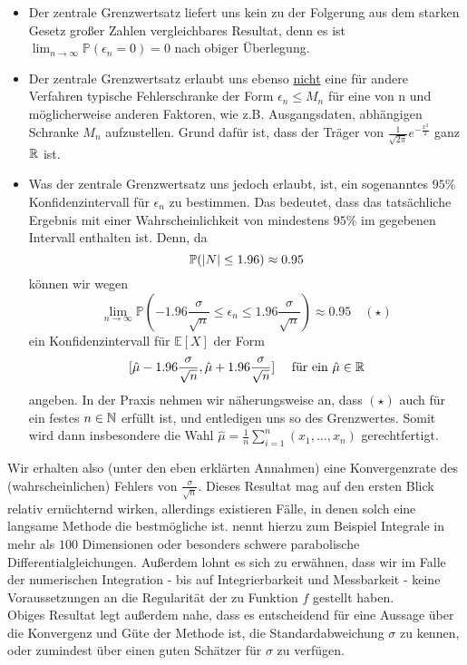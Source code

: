 	 \begin{itemize}
	 	\item Der zentrale Grenzwertsatz liefert uns kein zu der Folgerung aus dem starken Gesetz großer Zahlen vergleichbares Resultat, denn es ist  $ \lim_{n \to \infty} \mathbb{P}(\epsilon_n = 0) = 0 $ nach obiger Überlegung.
	 	\item Der zentrale Grenzwertsatz erlaubt uns ebenso \underline{nicht} eine für andere Verfahren typische Fehlerschranke der Form $ \epsilon_n \leq M_n $ für eine von n und möglicherweise anderen Faktoren, wie z.B. Ausgangsdaten, abhängigen Schranke $ M_n $ aufzustellen. Grund dafür ist, dass der Träger von $\frac{1}{\sqrt{2\pi}}e^{-\frac{x^2}{2}}$ ganz $ \mathbb{R} $ ist.
	 	\item Was der zentrale Grenzwertsatz uns jedoch erlaubt, ist, ein sogenanntes $ 95\% $ Konfidenzintervall für $ \epsilon_n $ zu bestimmen. Das bedeutet, dass das tatsächliche Ergebnis mit einer Wahrscheinlichkeit von mindestens $ 95 \% $ im gegebenen Intervall enthalten ist. Denn, da 
	 	\[
	 		\mathbb{P}(| N | \leq 1.96) \approx 0.95
	 	\]
	 	können wir wegen
	 	\[
	 		\lim\limits_{n\to\infty}\mathbb{P}(-1.96\frac{\sigma}{\sqrt{n}}\leq \epsilon_n \leq 1.96\frac{\sigma}{\sqrt{n}}) \approx 0.95 \quad (\star)
	 	\]
	 	ein Konfidenzintervall für $ \mathbb{E}[X] $ der Form
	 	\[
	 		[\hat{\mu}-1.96\frac{\sigma}{\sqrt{n}},\hat{\mu}+1.96\frac{\sigma}{\sqrt{n}}] \quad \text{ für ein } \hat{\mu} \in \mathbb{R}  
	 	\]
	 	angeben. In der Praxis nehmen wir näherungsweise an, dass $ (\star) $ auch für ein festes $ n \in \mathbb{N} $ erfüllt ist, und entledigen uns so des Grenzwertes. Somit wird dann insbesondere die Wahl $ \hat{\mu} = \frac{1}{n}\sum_{i=1}^{n}(x_1,\dots,x_n) $ gerechtfertigt.
	 \end{itemize}
 	Wir erhalten also (unter den eben erklärten Annahmen) eine Konvergenzrate des (wahrscheinlichen) Fehlers von $ \frac{\sigma}{\sqrt{n}} $. Dieses Resultat mag auf den ersten Blick relativ ernüchternd wirken, allerdings existieren Fälle, in denen solch eine langsame Methode die bestmögliche ist. \cite{lapeyre2003introduction} nennt hierzu zum Beispiel Integrale in mehr als $ 100 $ Dimensionen oder besonders schwere parabolische Differentialgleichungen. Außerdem lohnt es sich zu erwähnen, dass wir im Falle der numerischen Integration - bis auf Integrierbarkeit und Messbarkeit - keine Voraussetzungen an die Regularität der zu Funktion $ f $ gestellt haben.\\
 	Obiges Resultat legt außerdem nahe, dass es entscheidend für eine Aussage über die Konvergenz und Güte der Methode ist, die Standardabweichung $ \sigma $ zu kennen, oder zumindest über einen guten Schätzer für $ \sigma $ zu verfügen.
